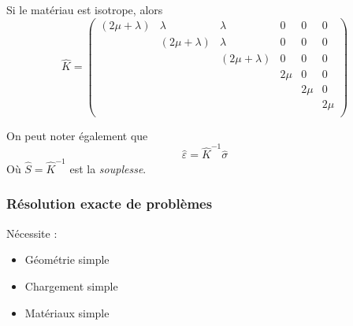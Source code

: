 \documentclass{article}
\begin{document}
Si le matériau est isotrope, alors
\[\hat{K} = 
\begin{pmatrix}
(2\mu+\lambda) & \lambda & \lambda & 0 & 0 & 0 \\
 & (2\mu+\lambda) & \lambda & 0 & 0 & 0 \\
& & (2\mu+\lambda) & 0 & 0 & 0 \\
&&&2\mu & 0 & 0\\
&&&&2\mu & 0 \\
&&&&&2 \mu \\
\end{pmatrix}
\]



On peut noter également que 
\[\hat{\varepsilon}=\hat{K}^{-1}\hat{\sigma}\]
Où $\hat{S}=\hat{K}^{-1}$ est la \emph{souplesse}.



\subsubsection*{Résolution exacte de problèmes}
Nécessite :
\begin{itemize}
\item Géométrie simple
\item Chargement simple
\item Matériaux simple
\end{itemize}
\end{document}
